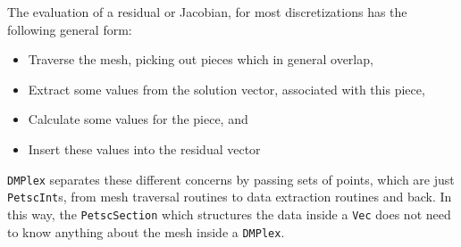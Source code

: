 The evaluation of a residual or Jacobian, for most discretizations has the following general form:
\begin{itemize}
  \item Traverse the mesh, picking out pieces which in general overlap,

  \item Extract some values from the solution vector, associated with this piece,

  \item Calculate some values for the piece, and

  \item Insert these values into the residual vector
\end{itemize}
\lstinline{DMPlex} separates these different concerns by passing sets of points, which are just \lstinline{PetscInt}s, from mesh traversal
routines to data extraction routines and back. In this way, the \lstinline{PetscSection} which structures the data inside a \lstinline{Vec} does
not need to know anything about the mesh inside a \lstinline{DMPlex}.

